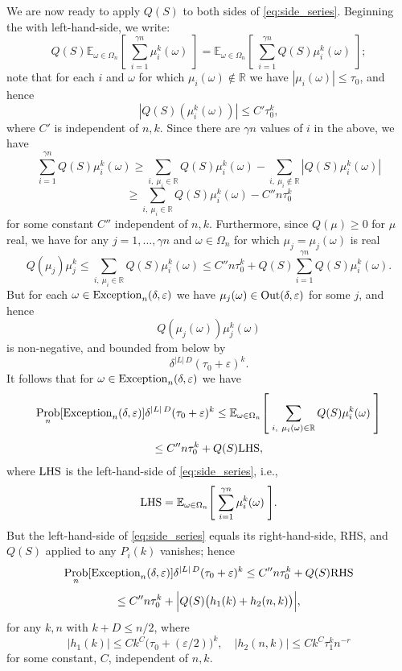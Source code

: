 \documentclass{memo-l}
\theoremstyle{plain}
\theoremstyle{definition}
\numberwithin{section}{chapter}
\numberwithin{equation}{chapter}
\newcommand{\expect}[2]{{\mathbb{E}}_{#1}{\left[\; #2\; \right]}}
\DeclareMathOperator{\Prob}{Prob}
\theoremstyle{plain}
\theoremstyle{definition}
\newcommand\RR{\mathbb{R}}
\begin{document}
We are now ready to apply \( Q(S) \) to both sides of
\eqref{eq:side_series}.  Beginning the with left-hand-side, we write: \[
Q(S) \expect{\omega\in \Omega_n}{ \sum_{i=1}^{\gamma n} \mu_i^k(\omega) } =
\expect{\omega\in \Omega_n}{ \sum_{i=1}^{\gamma n} Q(S)\mu_i^k(\omega)}; \]
note that for each \( i \) and \( \omega \) for which \(
\mu_i(\omega)\notin\RR \) we have \( |\mu_i(\omega)|\leq \tau_0 \), and
hence \[ |Q(S)(\mu_i^k(\omega)) | \leq C' \tau_0^k, \] where \( C' \) is
independent of \( n,k \).  Since there are \( \gamma n \) values of \( i \)
in the above, we have \[ \sum_{i=1}^{\gamma n} Q(S)\mu_i^k(\omega) \ge
\sum_{i,\ \mu_i\in\RR} Q(S)\mu_i^k(\omega) - \sum_{i,\ \mu_i\notin\RR}
|Q(S)\mu_i^k(\omega) | \] \[ \geq \sum_{i,\ \mu_i\in\RR}
Q(S)\mu_i^k(\omega) - C''n\tau_0^k \] for some constant \( C'' \)
independent of \( n,k \).  Furthermore, since \( Q(\mu)\geq 0 \) for \( \mu
\) real, we have for any \( j=1,\ldots,\gamma n \) and \( \omega\in\Omega_n
\) for which \( \mu_j=\mu_j(\omega) \) is real \[ Q(\mu_j)\mu_j^k \leq
\sum_{i,\ \mu_i\in\RR} Q(S)\mu_i^k(\omega) \leq C''n\tau_0^k + Q(S)
\sum_{i=1}^{\gamma n} Q(S)\mu_i^k(\omega).  \] But for each \(
\omega\in{\rm Exception}_n(\delta,\varepsilon) \) we have \(
\mu_j(\omega)\in{\rm Out}(\delta,\varepsilon) \) for some \( j \), and
hence \[ Q(\mu_j(\omega))\mu_j^k(\omega) \] is non-negative, and bounded
from below by \[ \delta^{|L|\,D} (\tau_0+\varepsilon)^k.  \] It follows
that for \( \omega\in{\rm Exception}_n(\delta,\varepsilon) \) we have \[
\Prob_n [{\rm Exception}_n(\delta,\varepsilon)] \delta^{|L|\,D}
(\tau_0+\varepsilon)^k \leq \expect{\omega\in\Omega_n}{ \sum_{i,\
\mu_i(\omega)\in\RR} Q(S)\mu_i^k(\omega)} \] \[ \leq C''n\tau_0^k + Q(S)
{\rm LHS}, \] where \( {\rm LHS} \) is the left-hand-side of
\eqref{eq:side_series}, i.e., \[ {\rm LHS} =
\expect{\omega\in\Omega_n}{\sum_{i=1}^{\gamma n} \mu_i^k(\omega)}.  \] But
the left-hand-side of \eqref{eq:side_series} equals its right-hand-side,
RHS, and \( Q(S) \) applied to any \( P_i(k) \) vanishes;  hence
\begin{equation}\label{eq:rhs1} \Prob_n [{\rm
Exception}_n(\delta,\varepsilon)] \delta^{|L|\,D}  (\tau_0+\varepsilon)^k
\leq C''n\tau_0^k + Q(S){\rm RHS} \end{equation}
\begin{equation}\label{eq:rhs2} \le C''n\tau_0^k + \Bigl|
Q(S)\bigl(h_1(k)+h_2(n,k)\bigr) \Bigr|, \end{equation} for any \( k,n \)
with \( k+D\leq n/2 \), where \[ |h_1(k)| \leq Ck^C
\bigl(\tau_0+(\varepsilon/2)\bigr)^k , \quad |h_2(n,k)| \leq Ck^C \tau_1^k
n^{-r} \] for some constant, \( C \), independent of \( n,k \).
\end{document}
